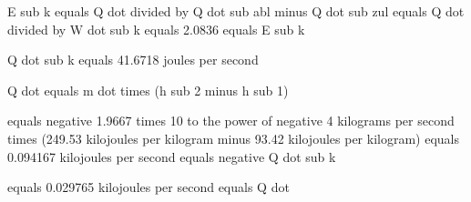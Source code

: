 E sub k equals Q dot divided by Q dot sub abl minus Q dot sub zul equals Q dot divided by W dot sub k equals 2.0836 equals E sub k

Q dot sub k equals 41.6718 joules per second

Q dot equals m dot times (h sub 2 minus h sub 1)

equals negative 1.9667 times 10 to the power of negative 4 kilograms per second times (249.53 kilojoules per kilogram minus 93.42 kilojoules per kilogram) equals 0.094167 kilojoules per second equals negative Q dot sub k

equals 0.029765 kilojoules per second equals Q dot